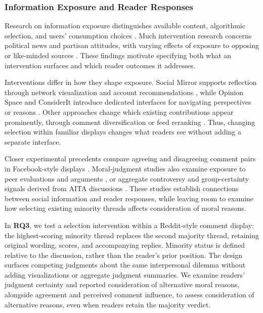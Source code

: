 \subsubsection*{Information Exposure and Reader Responses}

Research on information exposure distinguishes available content,
algorithmic selection, and users' consumption choices
\cite{bakshy2015exposure}. Much intervention research concerns
political news and partisan attitudes, with varying effects of
exposure to opposing or like-minded sources
\cite{bail2018exposure,levy2021social,nyhan2023likeminded}.
These findings motivate specifying both what an intervention
surfaces and which reader outcomes it addresses.

Interventions differ in how they shape exposure. Social Mirror
supports reflection through network visualization and account
recommendations \cite{gillani2018mirror}, while Opinion Space
and ConsiderIt introduce dedicated interfaces for navigating
perspectives or reasons
\cite{faridani2010opinion,kriplean2012considerit}. Other approaches
change which existing contributions appear prominently, through
comment diversification \cite{northcutt2017diversification} or
feed reranking \cite{piccardi2025reranking}. Thus, changing
selection within familiar displays 
changes what readers see without adding a separate interface. 

Closer experimental precedents compare agreeing and disagreeing
comment pairs in Facebook-style displays
\cite{dutceac2022cueing}. Moral-judgment studies also examine
exposure to peer evaluations and arguments
\cite{kelly2017moral}, or aggregate controversy and group-certainty
signals derived from AITA discussions
\cite{chen2026controversy}. These studies establish connections
between social information and reader responses, while leaving
room to examine how selecting existing minority threads affects
consideration of moral reasons.

In \textbf{RQ3}, we test a selection intervention within a
Reddit-style comment display: the highest-scoring minority
thread replaces the second majority thread, retaining original
wording, scores, and accompanying replies. Minority status is
defined relative to the discussion, rather than the reader's
prior position. The design surfaces competing judgments about
the same interpersonal dilemma without adding visualizations
or aggregate judgment summaries. We examine readers' judgment
certainty and reported consideration of alternative moral
reasons, alongside agreement and perceived comment influence,
to assess 
consideration of alternative reasons, even when readers retain the majority verdict.
